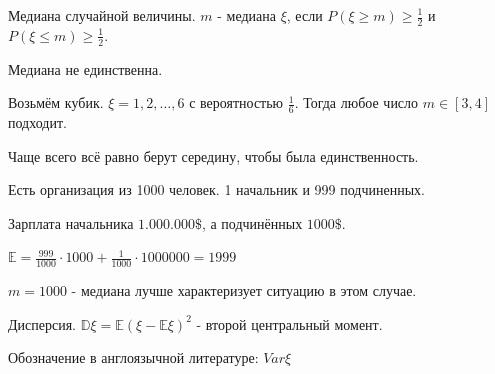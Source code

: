 \begin{definition}
    Медиана случайной величины. $m$ - медиана $\xi$, если $P(\xi \geqslant m) \geqslant \frac{1}{2}$ и
    $P(\xi \leqslant m) \geqslant \frac{1}{2}$.

    \begin{remark}
        Медиана не единственна.

        Возьмём кубик. $\xi = 1, 2, \ldots, 6$ с вероятностью $\frac{1}{6}$.
        Тогда любое число $m \in [3, 4]$ подходит.

        Чаще всего всё равно берут середину, чтобы была единственность.
    \end{remark}
\end{definition}

\begin{example}
    Есть организация из 1000 человек. 1 начальник и 999 подчиненных.

    Зарплата начальника $1.000.000 \$ $, а подчинённых $1000 \$ $.

    $\mathbb{E} = \frac{999}{1000} \cdot 1000 + \frac{1}{1000} \cdot 1000000 = 1999$

    $m = 1000$ - медиана лучше характеризует ситуацию в этом случае.
\end{example}

\begin{definition}
    Дисперсия. $\mathbb{D} \xi = \mathbb{E}(\xi - \mathbb{E} \xi)^2$ - второй центральный момент.

    Обозначение в англоязычной литературе: $Var \xi$
\end{definition}

